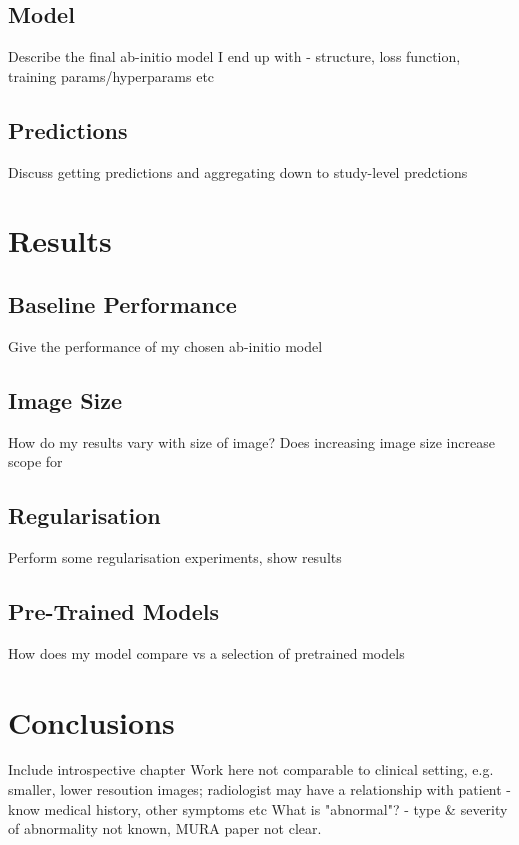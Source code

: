 \documentclass[11pt]{article} %
\theoremstyle{plain}
\theoremstyle{definition}
\begin{document}
\subsection{Model}
Describe the final ab-initio model I end up with - structure, loss function, training params/hyperparams etc

\subsection{Predictions}
Discuss getting predictions and aggregating down to study-level predctions



\newpage
\section{Results}

\subsection{Baseline Performance}
Give the performance of my chosen ab-initio model

\subsection{Image Size}
How do my results vary with size of image? Does increasing image size increase scope for

\subsection{Regularisation}
Perform some regularisation experiments, show results

\subsection{Pre-Trained Models}
How does my model compare vs a selection of pretrained models



\newpage
\section{Conclusions}
Include introspective chapter
Work here not comparable to clinical setting, e.g. smaller, lower resoution images; radiologist may have a relationship with patient - know medical history, other symptoms etc
What is "abnormal"? - type \& severity of abnormality not known, MURA paper not clear.
\end{document}
